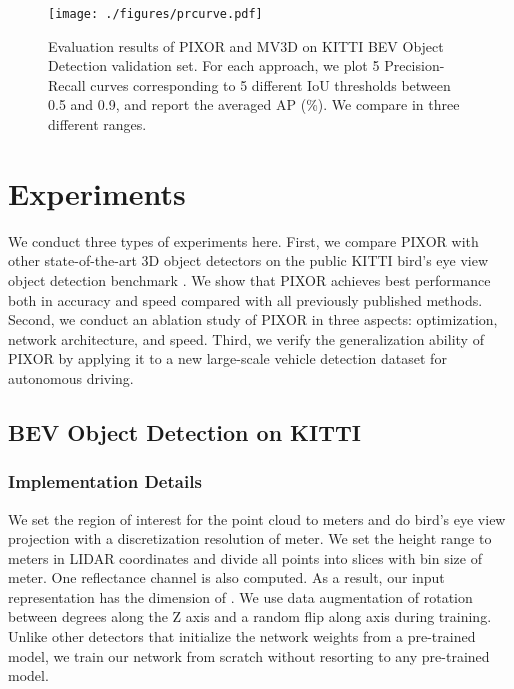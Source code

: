 

\begin{figure*}[t]
\begin{center}
   \texttt{[image: ./figures/prcurve.pdf]}
\end{center}
\vspace*{-2mm}
\caption{Evaluation results of PIXOR and MV3D \cite{mv3d} on KITTI BEV Object Detection validation set. For each approach, we plot 5 Precision-Recall curves corresponding to 5 different IoU thresholds between 0.5 and 0.9, and report the averaged AP (\%). We compare in three different ranges.}
\label{fig:fine_kitti}
\vspace{-0.3cm}
\end{figure*}


\section{Experiments}

We conduct three types of experiments here. First, we compare PIXOR with other state-of-the-art 3D object detectors on the public KITTI bird's eye view object detection benchmark \cite{kitti}. We show that PIXOR achieves best performance both in accuracy and speed compared with all previously published methods. Second, we conduct an ablation study of PIXOR in three aspects: optimization, network architecture, and speed. Third, we verify the generalization ability of PIXOR by applying it to a new large-scale vehicle detection dataset for autonomous driving.

\subsection{BEV Object Detection on KITTI}

\subsubsection{Implementation Details} 
We set the region of interest for the point cloud to  meters and do bird's eye view projection with a discretization resolution of  meter. We set the height range to  meters in LIDAR coordinates and divide all points into  slices with bin size of  meter. One reflectance channel is also computed. As a result, our input representation has the dimension of . We use data augmentation of rotation between  degrees along the Z axis and a random flip along  axis during training. Unlike other detectors \cite{mv3d} that initialize the network weights from a pre-trained model, we train our network from scratch without resorting to any pre-trained model.

